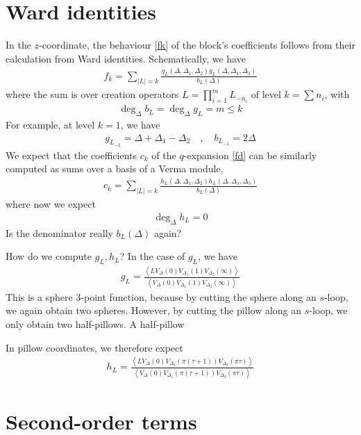 \documentclass[12pt,a4paper]{article}
\begin{document}
\section{Ward identities}

In the $z$-coordinate, the behaviour \eqref{fk} of the block's coefficients follows from their calculation from Ward identities. Schematically, we have 
\begin{align}
 f_k = \sum_{|L|=k} \frac{g_L(\Delta,\Delta_1,\Delta_2)g_L(\Delta,\Delta_4,\Delta_3)}{b_L(\Delta)} 
\end{align}
where the sum is over creation operators $L=\prod_{i=1}^m L_{-n_i}$ of level $k=\sum n_i$, with 
\begin{align}
 \deg_\Delta b_L = \deg_\Delta g_L =m\leq k
\end{align}
For example, at level $k=1$, we have 
\begin{align}
 g_{L_{-1}} = \Delta + \Delta_1-\Delta_2 \quad , \quad b_{L_{-1}} = 2\Delta 
\end{align}
We expect that the coefficients $c_k$ of the $q$-expansion \eqref{fd} can be similarly computed as sums over a basis of a Verma module, 
\begin{align}
 c_k = \sum_{|L|=k} \frac{h_L(\Delta,\Delta_1,\Delta_2)h_L(\Delta,\Delta_4,\Delta_3)}{b_L(\Delta)} 
\end{align}
where now we expect 
\begin{align}
 \deg_\Delta h_L = 0 
\end{align}
Is the denominator really $b_L(\Delta)$ again? 

How do we compute $g_L,h_L$? In the case of $g_L$, we have 
\begin{align}
 g_L = \frac{\left< LV_{\Delta}(0)V_{\Delta_1}(1)V_{\Delta_2}(\infty)\right>}{\left< V_{\Delta}(0)V_{\Delta_1}(1)V_{\Delta_2}(\infty)\right>}
\end{align}
This is a sphere 3-point function, because by cutting the sphere along an $s$-loop, we again obtain two spheres. However, by cutting the pillow along an $s$-loop, we only obtain two half-pillows. A half-pillow 

In pillow coordinates, we therefore expect
\begin{align}
 h_L = \frac{\left< LV_{\Delta}(0)V_{\Delta_1}(\pi(\tau+1))V_{\Delta_2}(\pi\tau)\right>}{\left< V_{\Delta}(0)V_{\Delta_1}(\pi(\tau+1))V_{\Delta_2}(\pi\tau)\right>}
\end{align}

\section{Second-order terms}
\end{document}
